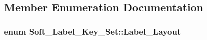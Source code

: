 \subsection{Member Enumeration Documentation}
\hypertarget{class_soft___label___key___set_a4d68b5593db1c9c763e3916b2b6edaf6}{
\subsubsection[{Label\-\_\-\-Layout}]{\setlength{\rightskip}{0pt plus 5cm}enum {\bf Soft\-\_\-\-Label\-\_\-\-Key\-\_\-\-Set\-::\-Label\-\_\-\-Layout}}}\label{class_soft___label___key___set_a4d68b5593db1c9c763e3916b2b6edaf6}
